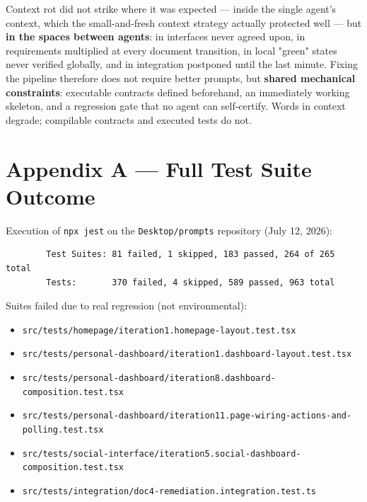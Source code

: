 \documentclass[11pt,a4paper]{article}
\newcommand{\file}[1]{\texttt{\small #1}}
\begin{document}
	Context rot did not strike where it was expected --- inside the single agent's context, which the small-and-fresh context strategy actually protected well --- but \textbf{in the spaces between agents}: in interfaces never agreed upon, in requirements multiplied at every document transition, in local "green" states never verified globally, and in integration postponed until the last minute. Fixing the pipeline therefore does not require better prompts, but \textbf{shared mechanical constraints}: executable contracts defined beforehand, an immediately working skeleton, and a regression gate that no agent can self-certify. Words in context degrade; compilable contracts and executed tests do not.
	
	\appendix
	\newpage
	
	\section{Appendix A --- Full Test Suite Outcome}
	
	Execution of \file{npx jest} on the \file{Desktop/prompts} repository (July 12, 2026):
	
	\begin{verbatim}
		Test Suites: 81 failed, 1 skipped, 183 passed, 264 of 265 total
		Tests:       370 failed, 4 skipped, 589 passed, 963 total
	\end{verbatim}
	
	Suites failed due to real regression (not environmental):
	
	\begin{itemize}[leftmargin=1.5em,itemsep=1pt]
		\item \file{src/tests/homepage/iteration1.homepage-layout.test.tsx}
		\item \file{src/tests/personal-dashboard/iteration1.dashboard-layout.test.tsx}
		\item \file{src/tests/personal-dashboard/iteration8.dashboard-composition.test.tsx}
		\item \file{src/tests/personal-dashboard/iteration11.page-wiring-actions-and-polling.test.tsx}
		\item \file{src/tests/social-interface/iteration5.social-dashboard-composition.test.tsx}
		\item \file{src/tests/integration/doc4-remediation.integration.test.ts}
	\end{itemize}
	
\end{document}
